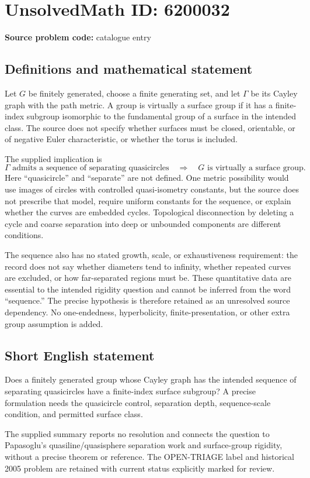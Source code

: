 \documentclass[11pt]{article}
\begin{document}
\section*{UnsolvedMath ID: 6200032}
\textbf{Source problem code:} catalogue entry
\subsection{Definitions and mathematical statement}
Let $G$ be finitely generated, choose a finite generating set, and let $\Gamma$ be its Cayley graph with the path metric. A group is virtually a surface group if it has a finite-index subgroup isomorphic to the fundamental group of a surface in the intended class. The source does not specify whether surfaces must be closed, orientable, or of negative Euler characteristic, or whether the torus is included.

The supplied implication is
\[
 \Gamma\text{ admits a sequence of separating quasicircles}
 \quad\Longrightarrow\quad
 G\text{ is virtually a surface group}.
\]
Here ``quasicircle'' and ``separate'' are not defined. One metric possibility would use images of circles with controlled quasi-isometry constants, but the source does not prescribe that model, require uniform constants for the sequence, or explain whether the curves are embedded cycles. Topological disconnection by deleting a cycle and coarse separation into deep or unbounded components are different conditions.

The sequence also has no stated growth, scale, or exhaustiveness requirement: the record does not say whether diameters tend to infinity, whether repeated curves are excluded, or how far-separated regions must be. These quantitative data are essential to the intended rigidity question and cannot be inferred from the word ``sequence.'' The precise hypothesis is therefore retained as an unresolved source dependency. No one-endedness, hyperbolicity, finite-presentation, or other extra group assumption is added.
\subsection{Short English statement}
Does a finitely generated group whose Cayley graph has the intended sequence of separating quasicircles have a finite-index surface subgroup? A precise formulation needs the quasicircle control, separation depth, sequence-scale condition, and permitted surface class.

The supplied summary reports no resolution and connects the question to Papasoglu's quasiline/quasisphere separation work and surface-group rigidity, without a precise theorem or reference. The OPEN-TRIAGE label and historical 2005 problem are retained with current status explicitly marked for review.
\end{document}
